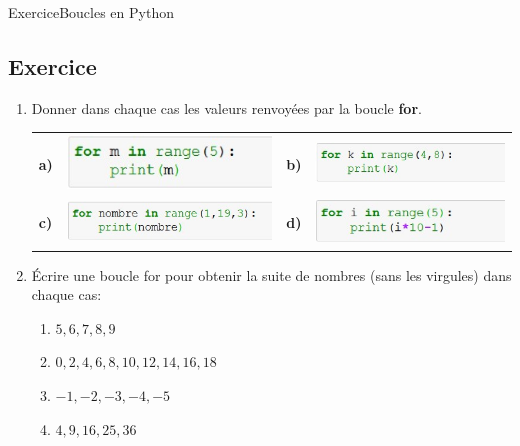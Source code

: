 \documentclass[11pt,a4paper]{article}
\newcounter{numexo}
\begin{document}
\begin{NSI}
{Exercice}{Boucles en Python}
\end{NSI}


\addtocounter{numexo}{1}
\subsection*{\Large Exercice \thenumexo }
\begin{enumerate}
\item Donner dans chaque cas les valeurs renvoyées par la boucle \textbf{for}.

\begin{tabular}{p{0.6cm}p{8cm}p{0.6cm}p{8cm}}
\textbf{a)} & \includegraphics[scale=0.8]{img/boucle1.eps} & \textbf{b)} &
\includegraphics[scale=0.8]{img/boucle2.eps}\\
\textbf{c)} & \includegraphics[scale=0.8]{img/boucle3.eps} & \textbf{d)} &
\includegraphics[scale=0.8]{img/boucle4.eps}\\
\end{tabular}\medskip

\item Écrire une boucle for pour obtenir la suite de nombres (sans les virgules) dans chaque cas:
\begin{enumerate}
\item $5, 6, 7, 8, 9$
\item $0, 2, 4, 6, 8, 10, 12, 14, 16, 18$
\item $-1, -2, -3, -4, -5$
\item $4, 9, 16, 25, 36$
\end{enumerate}
\end{enumerate}
\end{document}
